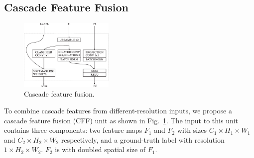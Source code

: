 \documentclass[runningheads]{llncs}
\begin{document}


\subsection{Cascade Feature Fusion}\label{sec:cff}
\begin{figure}
	\includegraphics[width=0.4\textwidth]{figure/cff.eps}
	\caption{Cascade feature fusion.}%
	\label{fig:cascadefeaturefusion}
\end{figure}

To combine cascade features from different-resolution inputs, we propose a cascade feature fusion (CFF) unit as shown in Fig.~\ref{fig:cascadefeaturefusion}. The input to this unit contains three components: two feature maps $F_1$ and $F_2$ with sizes $C_1 \times H_1 \times W_1$ and $C_2 \times H_2 \times W_2$ respectively, and a ground-truth label with resolution $1 \times H_2 \times W_2$. $F_2$ is with doubled spatial size of $F_1$.
\end{document}
